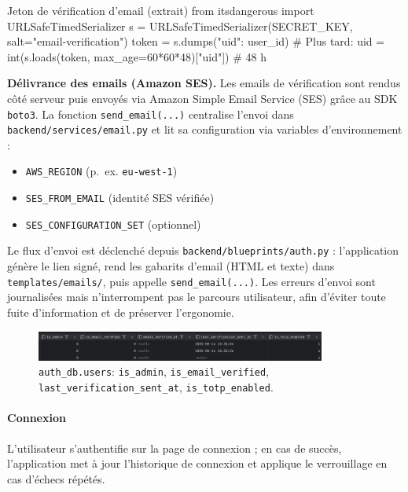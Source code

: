 \begin{codebox}[language=Python]{Jeton de vérification d'email (extrait)}
from itsdangerous import URLSafeTimedSerializer
s = URLSafeTimedSerializer(SECRET_KEY, salt="email-verification")
token = s.dumps({"uid": user_id})
# Plus tard:  uid = int(s.loads(token, max_age=60*60*48)["uid"])  # 48 h
\end{codebox}

\noindent\textbf{Délivrance des emails (Amazon SES).} Les emails de vérification sont rendus côté serveur puis envoyés via Amazon Simple Email Service (SES) grâce au SDK \texttt{boto3}. La fonction \texttt{send\_email(...)} centralise l'envoi dans \texttt{backend/services/email.py} et lit sa configuration via variables d'environnement :
\begin{itemize}
  \item \texttt{AWS\_REGION} (p.~ex. \texttt{eu-west-1})
  \item \texttt{SES\_FROM\_EMAIL} (identité SES vérifiée)
  \item \texttt{SES\_CONFIGURATION\_SET} (optionnel)
\end{itemize}
Le flux d'envoi est déclenché depuis \texttt{backend/blueprints/auth.py} : l'application génère le lien signé, rend les gabarits d'email (HTML et texte) dans \texttt{templates/emails/}, puis appelle \texttt{send\_email(...)}. Les erreurs d'envoi sont journalisées mais n'interrompent pas le parcours utilisateur, afin d'éviter toute fuite d'information et de préserver l'ergonomie.

\begin{figure}[H]
  \centering
  \includegraphics[width=0.85\textwidth]{../figures/chap10/auth_db2.png}
  \caption{\texttt{auth\_db.users}: \texttt{is\_admin}, \texttt{is\_email\_verified}, \texttt{last\_verification\_sent\_at}, \texttt{is\_totp\_enabled}.}
\end{figure}

\paragraph{Connexion}
L'utilisateur s'authentifie sur la page de connexion ; en cas de succès, l'application met à jour l'historique de connexion et applique le verrouillage en cas d'échecs répétés.

